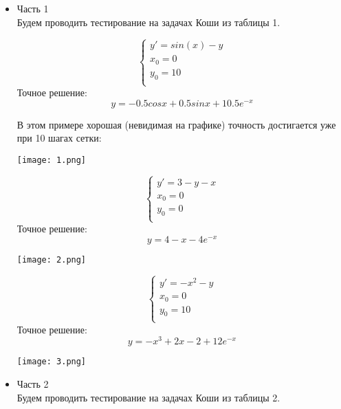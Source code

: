 \documentclass[a4paper,12pt,titlepage,finall]{article}
\begin{document}
\begin{itemize}


\item Часть 1\\

Будем проводить тестирование на задачах Коши из таблицы 1.

\begin{equation*}
 \begin{cases}
   y' = sin(x) - y\\
   x_0 = 0\\
   y_0 = 10\\
 \end{cases}
\end{equation*}
Точное решение: $$y = -0.5 cosx + 0.5 sinx + 10.5 e^{-x} $$\newline

В этом примере хорошая (невидимая на графике) точность достигается уже при 10 шагах сетки:

\texttt{[image: 1.png]}\newline


\begin{equation*}
 \begin{cases}
   y' = 3-y-x\\
   x_0 = 0\\
   y_0 = 0\\
 \end{cases}
\end{equation*}
Точное решение: $$y =4 -x - 4 e^{-x} $$\newline

\texttt{[image: 2.png]}


\begin{equation*}
 \begin{cases}
   y' = -x^{2} - y\\
   x_0 = 0\\
   y_0 = 10\\
 \end{cases}
\end{equation*}
Точное решение: $$y =-x^{3} + 2x -2 + 12 e^{-x} $$\newline


\texttt{[image: 3.png]}\newline


\newpage
\item Часть 2\\

Будем проводить тестирование на задачах Коши из таблицы 2.



\end{itemize}
\end{document}
